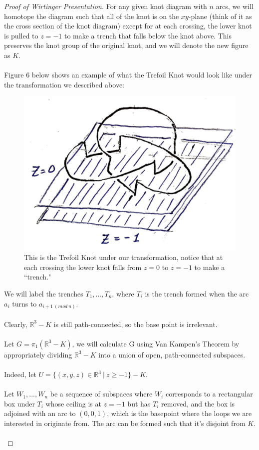 \documentclass{article}
\begin{document}
\begin{proof}[Proof of Wirtinger Presentation]
For any given knot diagram with $n$ arcs, we will homotope the diagram such that all of the knot is on the $xy$-plane (think of it as the cross section of the knot diagram) except for at each crossing, the lower knot is pulled to $z = -1$ to make a trench that falls below the knot above. This preserves the knot group of the original knot, and we will denote the new figure as $K$.\\\\
Figure 6 below shows an example of what the Trefoil Knot would look like under the transformation we described above:
	\begin{figure}[h!]
		\centering
		\captionsetup{width=.75\linewidth}
		\includegraphics[width=.5\linewidth]{figures/trefoil_crossings.png}
		\caption{This is the Trefoil Knot under our transformation, notice that at each crossing the lower knot falls from $z = 0$ to $z = -1$ to make a ``trench."}
		\label{fig:rtinstability}
	\end{figure}
We will label the trenches $T_1, ..., T_n$, where $T_i$ is the trench formed when the arc $a_{i}$ turns to $a_{i + 1\ (mod\ n)}$.\\\\
Clearly, $\mathbb{R}^3 - K$ is still path-connected, so the base point is irrelevant.\\\\
Let $G = \pi_1(\mathbb{R}^3 - K)$, we will calculate G using Van Kampen's Theorem by appropriately dividing $\mathbb{R}^3 - K$ into a union of open, path-connected subspaces.\\\\
Indeed, let $U = \{(x, y, z) \in \mathbb{R}^3\ |\ z \geq -1\} - K$.\\\\
Let $W_1, ..., W_n$ be a sequence of subspaces where $W_i$ corresponds to a rectangular box under $T_i$ whose ceiling is at $z= -1$ but has $T_i$ removed, and the box is adjoined with an arc to $(0, 0, 1)$, which is the basepoint where the loops we are interested in originate from. The arc can be formed such that it's disjoint from $K$.\\\\

\end{proof}
\end{document}
